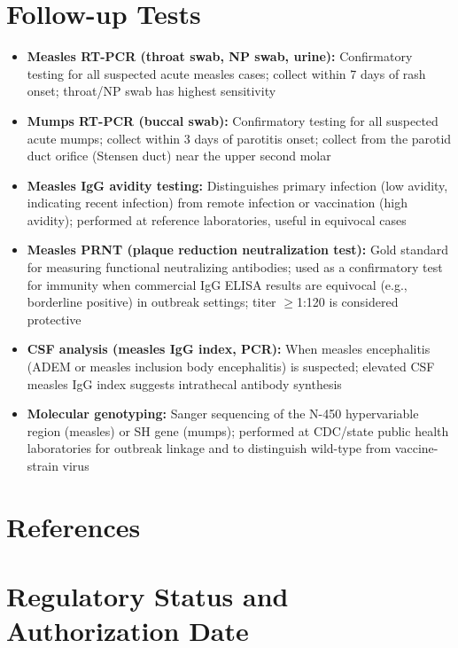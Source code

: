 \section*{Follow-up Tests}
\begin{itemize}
  \item \textbf{Measles RT-PCR (throat swab, NP swab, urine):} Confirmatory testing for all suspected acute measles cases; collect within 7 days of rash onset; throat/NP swab has highest sensitivity
  \item \textbf{Mumps RT-PCR (buccal swab):} Confirmatory testing for all suspected acute mumps; collect within 3 days of parotitis onset; collect from the parotid duct orifice (Stensen duct) near the upper second molar
  \item \textbf{Measles IgG avidity testing:} Distinguishes primary infection (low avidity, indicating recent infection) from remote infection or vaccination (high avidity); performed at reference laboratories, useful in equivocal cases
  \item \textbf{Measles PRNT (plaque reduction neutralization test):} Gold standard for measuring functional neutralizing antibodies; used as a confirmatory test for immunity when commercial IgG ELISA results are equivocal (e.g., borderline positive) in outbreak settings; titer $\geq$1:120 is considered protective
  \item \textbf{CSF analysis (measles IgG index, PCR):} When measles encephalitis (ADEM or measles inclusion body encephalitis) is suspected; elevated CSF measles IgG index suggests intrathecal antibody synthesis
  \item \textbf{Molecular genotyping:} Sanger sequencing of the N-450 hypervariable region (measles) or SH gene (mumps); performed at CDC/state public health laboratories for outbreak linkage and to distinguish wild-type from vaccine-strain virus
\end{itemize}

\section*{References}



\clearpage
\section*{Regulatory Status and Authorization Date}

\clearpage
